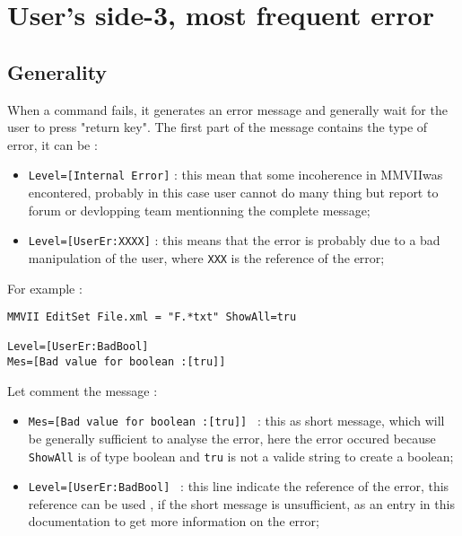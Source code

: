 \documentclass[a4paper]{book}
\newcommand{\PPP}{MMVII}
\begin{document}

\section{User's side-3, most frequent error}



\subsection{Generality}

When a command fails, it generates an error message and generally wait for 
the user to press "return key".
The first part of the message contains the type of error, it can be :

\begin{itemize}
   \item {\tt Level=[Internal Error]} : this mean that some incoherence in \PPP was encontered,
         probably in this case user cannot do many thing but report to forum or devlopping team
         mentionning the complete message;

   \item {\tt Level=[UserEr:XXXX]} : this means that the error is probably due to a bad
        manipulation of the user, where {\tt XXX}  is the reference of the error;
\end{itemize}

For example :

\begin{verbatim}
MMVII EditSet File.xml = "F.*txt" ShowAll=tru

Level=[UserEr:BadBool]
Mes=[Bad value for boolean :[tru]]
\end{verbatim}

Let comment the message :

\begin{itemize}
   \item {\tt Mes=[Bad value for boolean :[tru]] } : this as short message, which will be generally
         sufficient to analyse the error, here the error occured because {\tt ShowAll} is of type
         boolean and {\tt tru} is not a valide string to create a boolean;

   \item {\tt Level=[UserEr:BadBool] } : this line indicate the reference of the error,
         this reference can be used , if the short message is unsufficient, as an entry in this
         documentation to get more information on the error;

\end{itemize}
\end{document}
